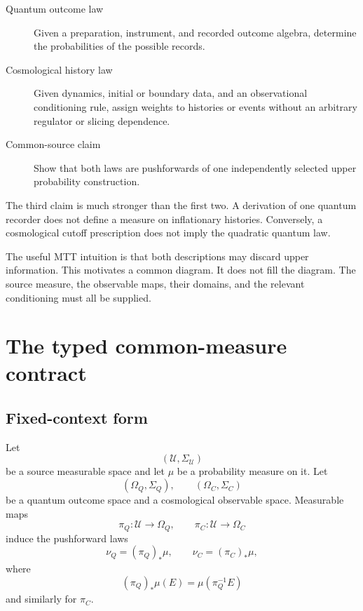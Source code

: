 \documentclass[11pt]{article}
\newcommand{\U}{\mathcal{U}}
\begin{document}
\begin{description}
\item[Quantum outcome law] Given a preparation, instrument, and recorded
outcome algebra, determine the probabilities of the possible records.
\item[Cosmological history law] Given dynamics, initial or boundary data, and
an observational conditioning rule, assign weights to histories or events
without an arbitrary regulator or slicing dependence.
\item[Common-source claim] Show that both laws are pushforwards of one
independently selected upper probability construction.
\end{description}

The third claim is much stronger than the first two. A derivation of one
quantum recorder does not define a measure on inflationary histories.
Conversely, a cosmological cutoff prescription does not imply the quadratic
quantum law.

The useful MTT intuition is that both descriptions may discard upper
information. This motivates a common diagram. It does not fill the diagram.
The source measure, the observable maps, their domains, and the relevant
conditioning must all be supplied.

\section{The typed common-measure contract}

\subsection{Fixed-context form}

Let
\[
(\U,\Sigma_{\U})
\]
be a source measurable space and let \(\mu\) be a probability measure on it.
Let
\[
(\Omega_Q,\Sigma_Q),\qquad
(\Omega_C,\Sigma_C)
\]
be a quantum outcome space and a cosmological observable space. Measurable maps
\[
\pi_Q:\U\longrightarrow\Omega_Q,
\qquad
\pi_C:\U\longrightarrow\Omega_C
\]
induce the pushforward laws
\begin{equation}
\nu_Q=(\pi_Q)_{\!*}\mu,\qquad
\nu_C=(\pi_C)_{\!*}\mu,
\label{eq:pushforwards}
\end{equation}
where
\[
(\pi_Q)_{\!*}\mu(E)=\mu(\pi_Q^{-1}E)
\]
and similarly for \(\pi_C\).
\end{document}
